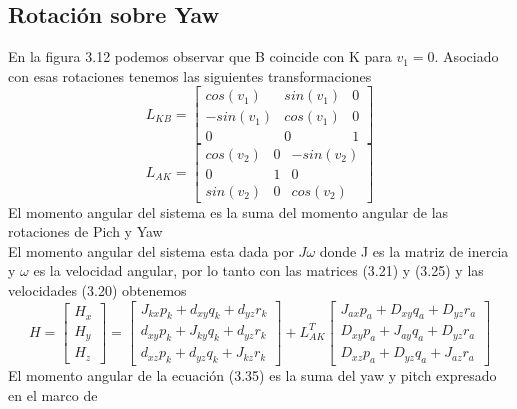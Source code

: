 \subsection{Rotación sobre Yaw}
En la figura 3.12 podemos observar que B coincide con K para $v_1 = 0$. Asociado con esas rotaciones
tenemos las siguientes transformaciones
\begin{equation}
	L_{KB} =
	\begin{bmatrix}
		cos(v_1)  & sin(v_1) & 0 \\
		-sin(v_1) & cos(v_1) & 0 \\
		0         & 0        & 1
	\end{bmatrix}
\end{equation}
\begin{equation}
	L_{AK} =
	\begin{bmatrix}
		cos(v_2) & 0 & -sin(v_2) \\
		0        & 1 & 0         \\
		sin(v_2) & 0 & cos(v_2)
	\end{bmatrix}
\end{equation}
El momento angular del sistema es la suma del momento angular de las rotaciones
de Pich y Yaw \cite{Paper::Yoon2001}\\
El momento angular del sistema esta dada por $J\omega$ donde J es la matriz de inercia y $\omega$
es la velocidad angular, por lo tanto con las matrices (3.21) y (3.25) y las velocidades (3.20)
obtenemos
\begin{equation}
	H =
	\begin{bmatrix}
		H_x \\
		H_y \\
		H_z
	\end{bmatrix}
	=
	\begin{bmatrix}
		J_{kx}p_k + d_{xy}q_k + d_{yz}r_k \\
		d_{xy}p_k + J_{ky}q_k + d_{yz}r_k \\
		d_{xz}p_k + d_{yz}q_k + J_{kz}r_k
	\end{bmatrix}
	+L^T_{AK}
	\begin{bmatrix}
		J_{ax}p_a + D_{xy}q_a + D_{yz}r_a \\
		D_{xy}p_a + J_{ay}q_a + D_{yz}r_a \\
		D_{xz}p_a + D_{yz}q_a + J_{az}r_a
	\end{bmatrix}
\end{equation}
El momento angular de la ecuación (3.35) es la suma del yaw y pitch expresado en el marco de

